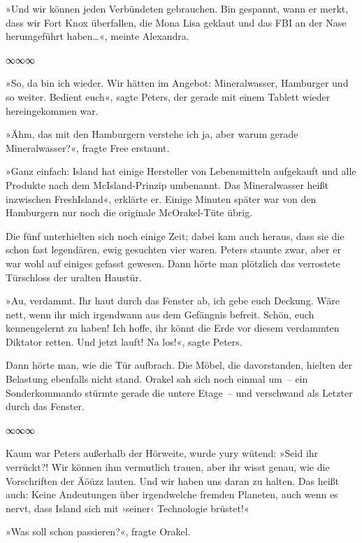 »Und wir können jeden Verbündeten gebrauchen. Bin gespannt, wann er merkt, dass wir Fort Knox überfallen, die Mona Lisa geklaut und das FBI an der Nase herumgeführt haben…«, meinte Alexandra.

\begin{center}
    ∞∞∞
\end{center}

»So, da bin ich wieder. Wir hätten im Angebot: Mineralwasser, Hamburger und so weiter. Bedient euch«, sagte Peters, der gerade mit einem Tablett wieder hereingekommen war.

»Ähm, das mit den Hamburgern verstehe ich ja, aber warum gerade Mineralwasser?«, fragte Free erstaunt.

»Ganz einfach: Island hat einige Hersteller von Lebensmitteln aufgekauft und alle Produkte nach dem McIsland-Prinzip umbenannt. Das Mineralwasser heißt inzwischen FreshIsland«, erklärte er. Einige Minuten später war von den Hamburgern nur noch die originale McOrakel-Tüte übrig.

Die fünf unterhielten sich noch einige Zeit; dabei kam auch heraus, dass sie die schon fast legendären, ewig gesuchten vier waren. Peters staunte zwar, aber er war wohl auf einiges gefasst gewesen. Dann hörte man plötzlich das verrostete Türschloss der uralten Haustür.

»Au, verdammt. Ihr haut durch das Fenster ab, ich gebe euch Deckung. Wäre nett, wenn ihr mich irgendwann aus dem Gefängnis befreit. Schön, euch kennengelernt zu haben! Ich hoffe, ihr könnt die Erde vor diesem verdammten Diktator retten. Und jetzt lauft! Na los!«, sagte Peters.

Dann hörte man, wie die Tür aufbrach. Die Möbel, die davorstanden, hielten der Belastung ebenfalls nicht stand. Orakel sah sich noch einmal um~– ein Sonderkommando stürmte gerade die untere Etage~– und verschwand als Letzter durch das Fenster.

\begin{center}
    ∞∞∞
\end{center}

Kaum war Peters außerhalb der Hörweite, wurde yury wütend: »Seid ihr verrückt?! Wir können ihm vermutlich trauen, aber ihr wisst genau, wie die Vorschriften der Äöüzz lauten. Und wir haben uns daran zu halten. Das heißt auch: Keine Andeutungen über irgendwelche fremden Planeten, auch wenn es nervt, dass Island sich mit ›seiner‹ Technologie brüstet!«

»Was soll schon passieren?«, fragte Orakel.

